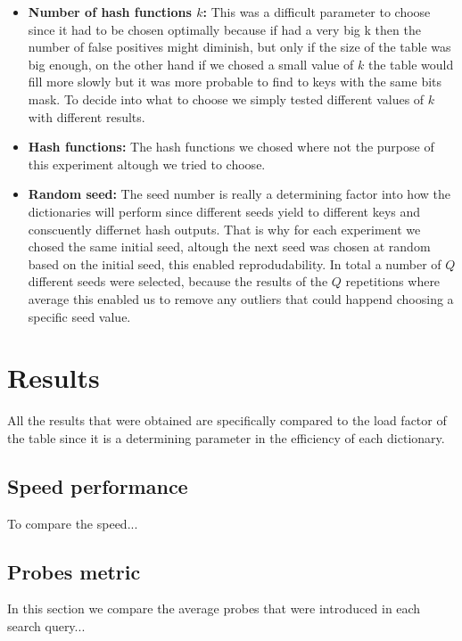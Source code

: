 \documentclass{article}
\begin{document}
\begin{itemize}
    \item \textbf{Number of hash functions $k$:}
    		 This was a difficult parameter to choose since it had to be chosen optimally because if had a very big k then the number of false positives might diminish, but only if the size of the table
    		 was big enough, on the other hand if we chosed a small value of $k$ the table would fill more slowly but it was more probable to find to keys with the same bits mask. To decide into what to choose 
    		 we simply tested different values of $k$ with different results. 
    		 
    \item \textbf{Hash functions:}
    		The hash functions we chosed where not the purpose of this experiment altough we tried to choose. 
    		
    \item \textbf{Random seed:}
    		The seed number is really a determining factor into how the dictionaries will perform since different seeds yield to different keys and conscuently differnet hash outputs. 
    		That is why for each experiment we chosed the same initial seed, altough the next seed was chosen at random based on the initial seed, this enabled reprodudability. In total 
    		a number of $Q$ different seeds were selected, because the results of the $Q$ repetitions where average this enabled us to remove any outliers that could happend choosing a specific seed value. 
    \end{itemize}
    \section{Results}
    All the results that were obtained are specifically compared to the load factor of the table since it is a determining parameter in the efficiency of each dictionary. 
    
    	\subsection*{Speed performance}
    	To compare the speed...
    	\subsection*{Probes metric}
    	In this section we compare the average probes that were introduced in each search query...
\end{document}
